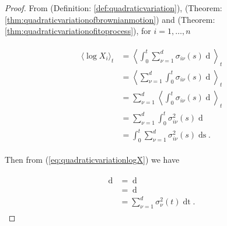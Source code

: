 \documentclass[british]{amsart}
\numberwithin{equation}{section}
\numberwithin{figure}{section}
\theoremstyle{plain}
\theoremstyle{definition}
\theoremstyle{plain}
\theoremstyle{plain}
\theoremstyle{plain}
\theoremstyle{remark}
\theoremstyle{plain}
\renewcommand{\d}[1]{\mathop{\mathrm{d}{#1}}}
\newcommand{\rangei}{i=1,\dots,n}
\begin{document}
\begin{proof} 

	From (Definition: \ref{def:quadraticvariation}), (Theorem: 
	\ref{thm:quadraticvariationofbrownianmotion}) and (Theorem: 
	\ref{thm:quadraticvariationofitoprocess}), for $\rangei$

	\begin{gather}
		\begin{split} 
			\label{eq:quadraticvariationlogX}
			\langle \log{X_{i}} \rangle_{t} 
			 & = \left< \int_{0}^{t} \sum_{\nu=1}^{d} \sigma_{i\nu}(s) \d{W_{\nu}(s)} \right>_{t} \\
			 & = \left< \sum_{\nu=1}^{d} \int_{0}^{t} \sigma_{i\nu}(s) \d{W_{\nu}(s)} \right>_{t} \\
			 & = \sum_{\nu=1}^{d} \left< \int_{0}^{t} \sigma_{i\nu}(s) \d{W_{\nu}(s)} \right>_{t} \\
			 & = \sum_{\nu=1}^{d} \int_{0}^{t} \sigma_{i\nu}^{2}(s) \d{\langle W_{\nu}(s) \rangle } \\
			 & = \int_{0}^{t} \sum_{\nu=1}^{d} \sigma_{i\nu}^{2}(s) \d{s}.
		\end{split}
	\end{gather}
	
	Then from (\ref{eq:quadraticvariationlogX}) we have
	
	\begin{gather}
		\begin{split}
			\d{\langle \log{X} \rangle_{t}}
				& = \d{\left<\int_{0}^{t} \sum_{\nu=1}^{d} \sigma_{\nu}(s) \d{W_{\nu}(s)}\right>_{t}}\\
				& = \d{\left(\int_{0}^{t} \sum_{\nu=1}^{d} \sigma_{\nu}^{2}(s) \d{s}\right)} \\
				& = \sum_{\nu=1}^{d} \sigma_{\nu}^{2}(t) \d{t}.
		\end{split}
	\end{gather}

\end{proof}
\end{document}
